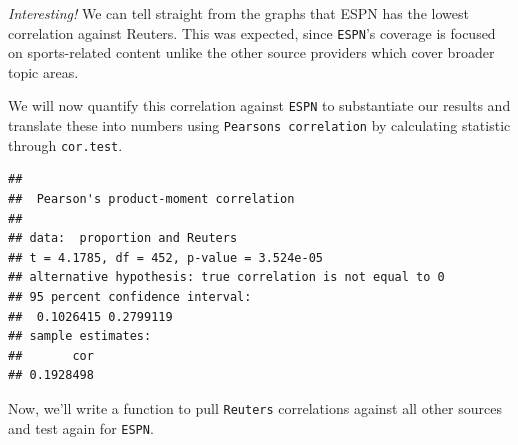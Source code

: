 \documentclass[
]{article}
\newenvironment{Shaded}{\begin{snugshade}}{\end{snugshade}}
\newcommand{\AttributeTok}[1]{\textcolor[rgb]{0.77,0.63,0.00}{#1}}
\newcommand{\ControlFlowTok}[1]{\textcolor[rgb]{0.13,0.29,0.53}{\textbf{#1}}}
\newcommand{\FunctionTok}[1]{\textcolor[rgb]{0.00,0.00,0.00}{#1}}
\newcommand{\NormalTok}[1]{#1}
\newcommand{\OtherTok}[1]{\textcolor[rgb]{0.56,0.35,0.01}{#1}}
\newcommand{\SpecialCharTok}[1]{\textcolor[rgb]{0.00,0.00,0.00}{#1}}
\newcommand{\StringTok}[1]{\textcolor[rgb]{0.31,0.60,0.02}{#1}}
\begin{document}
\emph{Interesting!} We can tell straight from the graphs that ESPN has
the lowest correlation against Reuters. This was expected, since
\texttt{ESPN}'s coverage is focused on sports-related content unlike the
other source providers which cover broader topic areas.

We will now quantify this correlation against \texttt{ESPN} to
substantiate our results and translate these into numbers using
\texttt{Pearson\textquotesingle{}s\ correlation} by calculating
statistic through \texttt{cor.test}.

\begin{Shaded}
\end{Shaded}

\begin{verbatim}
## 
##  Pearson's product-moment correlation
## 
## data:  proportion and Reuters
## t = 4.1785, df = 452, p-value = 3.524e-05
## alternative hypothesis: true correlation is not equal to 0
## 95 percent confidence interval:
##  0.1026415 0.2799119
## sample estimates:
##       cor 
## 0.1928498
\end{verbatim}

Now, we'll write a function to pull \texttt{Reuters} correlations
against all other sources and test again for \texttt{ESPN}.

\begin{Shaded}
\end{Shaded}
\end{document}
